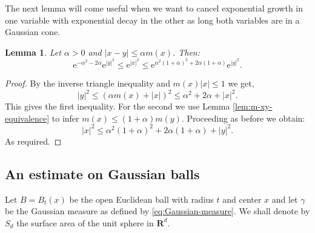 \documentclass{amsart}
\newtheorem{lemma}{Lemma}
\theoremstyle{remark}
\renewcommand{\leq}{\leqslant}
\renewcommand{\leq}{\leqslant}
\newcommand{\R}{\mathbf R}
\newcommand{\e}{\mathrm{e}} %
\renewcommand{\leq}{\leqslant}%
\begin{document}
The next lemma will come useful when we want to cancel exponential
growth in one variable with exponential decay in the other as long
both variables are in a Gaussian cone.
\begin{lemma}\label{lem:Cone-Gaussians-comparable}
  Let $\alpha > 0$ and $|x - y| \leq \alpha m(x)$. Then:
  \begin{equation*}
    \e^{-\alpha^2-2\alpha} \e^{|y|^2}
    \leq \e^{|x|^2} \leq
    \e^{\alpha^2(1 + \alpha)^2+2\alpha(1 + \alpha)} \e^{|y|^2} .
  \end{equation*}
\end{lemma}
\begin{proof}
  By the inverse triangle inequality and $m(x)|x| \leq 1$ we get, 
  \begin{equation*}
    |y|^2 \leq (\alpha m(x) + |x|)^2 \leq \alpha^2 + 2 \alpha + |x|^2.
  \end{equation*}
  This gives the first inequality.  For the second we use
  Lemma \ref{lem:m-xy-equivalence} to infer $m(x) \leq (1 + \alpha)
  m(y)$. Proceeding as before we obtain: 
  \begin{equation*}
    |x|^2 \leq \alpha^2 (1 + \alpha)^2 + 2 \alpha (1 + \alpha) + |y|^2.
  \end{equation*}
  As required.
\end{proof}

\subsection{An estimate on Gaussian balls}
Let $B = B_t(x)$ be the open Euclidean ball with radius $t$ and center $x$
and let $\gamma$ be the Gaussian measure as defined by
\eqref{eq:Gaussian-measure}. We shall denote by $S_d$ the surface area 
of the unit sphere in $\R^d$.
\end{document}
